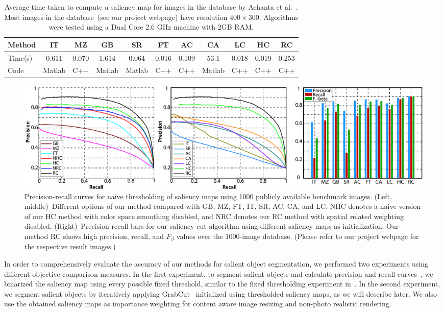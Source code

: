 \documentclass[final]{cvpr}
\newcommand{\IT}{IT\cite{98pami/Itti}}
\newcommand{\MZ}{MZ\cite{03ACMMM/Ma_Contrast-based}}
\newcommand{\GB}{GB\cite{conf/nips/HarelKP06}}
\newcommand{\SR}{SR\cite{07cvpr/hou_SpectralResidual}}
\newcommand{\FT}{FT\cite{09cvpr/Achanta_FTSaliency}}
\newcommand{\CA}{CA\cite{10cvpr/goferman_context}}
\newcommand{\LC}{LC\cite{06acmmm/ZhaiS_spatiotemporal}}
\newcommand{\AC}{AC\cite{08cvs/achanta_salient}}
\newcommand{\vnudge}{\vspace*{-.1in}}
\begin{document}
\begin{table}
    \centering
    \begin{tabular}{l|c|c|c|c|c|c|c|c|c|c} \hline\hline
      Method  &  \IT   &  \MZ  &   \GB  &  \SR   &  \FT  &  \AC  &  \CA   & \LC   &  HC   &  RC   \\ \hline
      Time(s) & 0.611  & 0.070 & 1.614  & 0.064  & 0.016 & 0.109 &  53.1  & 0.018 & 0.019 & 0.253 \\ \hline
      Code    & Matlab & C++   & Matlab & Matlab &  C++  &  C++  & Matlab &  C++  &  C++  &  C++  \\ \hline\hline
    \end{tabular}
    \caption{Average time taken to compute a saliency map for images in the database
        by Achanta et al.~\cite{09cvpr/Achanta_FTSaliency}. Most images in the
        database~(see our project webpage) have resolution $400\times300$.
        Algorithms were tested using a Dual Core 2.6 GHz machine with 2GB RAM.
    } \label{tab:TimeEfficency}
\end{table}


\begin{figure}
  \centering
  \includegraphics[width=\textwidth]{plots.pdf}
  \caption{Precision-recall curves for naive thresholding of saliency maps
    using 1000 publicly available benchmark images. (Left, middle)~Different options
    of our method compared with \GB, \MZ,  \FT, \IT, \SR, \AC, \CA, and \LC.
    NHC denotes a naive version of our HC method with color space smoothing disabled, and
    NRC denotes our RC method with spatial related weighting disabled.
    (Right)~Precision-recall bars for our saliency cut algorithm using
    different saliency maps as initialization. Our method RC shows high
    precision, recall, and $F_{\beta}$ values over the 1000-image database. (Please refer to
    our project webpage for the respective result images.)
  } \label{fig:plots} \vnudge
\end{figure}

In order to comprehensively evaluate the accuracy of our methods for salient object
segmentation, we performed two experiments using different objective comparison measures.
%
In the first experiment, to segment salient objects and calculate precision and recall
curves~\cite{07cvpr/hou_SpectralResidual}, we binarized the saliency map using every possible fixed
threshold, similar to the fixed thresholding experiment in~\cite{09cvpr/Achanta_FTSaliency}.
%
In the second experiment, we segment salient objects by iteratively applying
GrabCut~\cite{04tog/rother_grabcut} initialized using thresholded saliency maps, as we will describe later.
%
We also use the obtained saliency maps as importance weighting for content aware image
resizing and non-photo realistic rendering.
\end{document}
